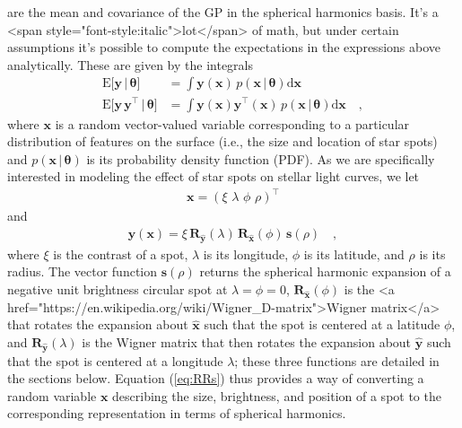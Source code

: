 are the mean and covariance of the GP in the spherical harmonics basis.
It's a <span style="font-style:italic">lot</span> of math, but under certain
assumptions it's possible to
compute the expectations in the expressions above analytically. These
are given by the integrals
\begin{align}
    \label{eq:exp_y}
    \mathrm{E} \Big[ \mathbf{y} \, \Big| \, \pmb{\theta} \Big]
     & =
    \int \mathbf{y}(\mathbf{x} ) \, p(\mathbf{x} \, \big| \, \pmb{\theta})\mathrm{d}\mathbf{x}
    \\
    \label{eq:exp_yy}
    \mathrm{E} \Big[ \mathbf{y} \, \mathbf{y}^\top \, \Big| \, \pmb{\theta} \Big]
     & =
    \int \mathbf{y}(\mathbf{x} ) \mathbf{y}^\top(\mathbf{x} ) \, p(\mathbf{x} \, \big| \, \pmb{\theta})\mathrm{d}\mathbf{x}
    \quad,
\end{align}
where $\mathbf{x}$ is a random vector-valued variable corresponding to a particular
distribution of features on the surface  (i.e., the size and location of star spots)
and $p(\mathbf{x} \, \big| \, \pmb{\theta})$ is its probability density
function (PDF).
As we are specifically interested in modeling the effect of star spots
on stellar light curves, we let
\begin{align}
    \mathbf{x} = \left( \xi \,\, \lambda \,\, \phi \,\, \rho \right)^\top
\end{align}
and
\begin{align}
    \label{eq:RRs}
    \mathbf{y}(\mathbf{x}) =
    \xi
    \,
    \mathbf{R}_{\hat{\mathbf{y}}}(\lambda)
    \,
    \mathbf{R}_{\hat{\mathbf{x}}}(\phi)
    \,
    \mathbf{s}(\rho)
    \quad,
\end{align}
where $\xi$ is the contrast of a spot,
$\lambda$ is its longitude, $\phi$ is its latitude,
and $\rho$ is its radius.
The vector function $\mathbf{s}(\rho)$
returns the spherical harmonic expansion of a negative unit brightness
circular spot at $\lambda = \phi = 0$,
$\mathbf{R}_{\hat{\mathbf{x}}}(\phi)$ is the <a href="https://en.wikipedia.org/wiki/Wigner_D-matrix">Wigner matrix</a> that rotates the
expansion about $\hat{\mathbf{x}}$ such that the spot is centered at a
latitude $\phi$, and $\mathbf{R}_{\hat{\mathbf{y}}}(\lambda)$ is the Wigner
matrix that then rotates the
expansion about $\hat{\mathbf{y}}$ such that the spot is centered at a
longitude $\lambda$; these three functions are detailed in the sections below.
Equation (\ref{eq:RRs}) thus provides a way of converting a random variable
$\mathbf{x}$ describing the size, brightness, and position of a spot to the
corresponding representation in terms of spherical harmonics.
